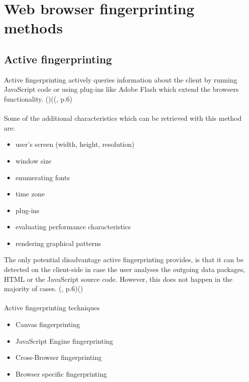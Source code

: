 \section{Web browser fingerprinting methods}\label{sec:Methods}
\subsection{Active fingerprinting}
Active fingerprinting actively queries information about the client by running JavaScript code or using plug-ins like Adobe Flash which extend the browsers functionality. (\textcite{web17})((\textcite{doty18}, p.6)\\\\
Some of the additional characteristics which can be retrieved with this method are:
\begin{itemize}
	\item user's screen (width, height, resolution)
	\item window size
	\item enumerating fonts
	\item time zone
	\item plug-ins
	\item evaluating performance characteristics
	\item rendering graphical patterns\\
\end{itemize}
The only potential disadvantage active fingerprinting provides, is that it can be detected on the client-side in case the user analyses the outgoing data packages, HTML or the JavaScript source code. However, this does not happen in the majority of cases. (\textcite{doty18}, p.6)(\textcite{web17})\\\\
Active fingerprinting techniques
\begin{itemize}
	\item Canvas fingerprinting
	\item JavaScript Engine fingerprinting
	\item Cross-Browser fingerprinting
	\item Browser specific fingerprinting
\end{itemize}


